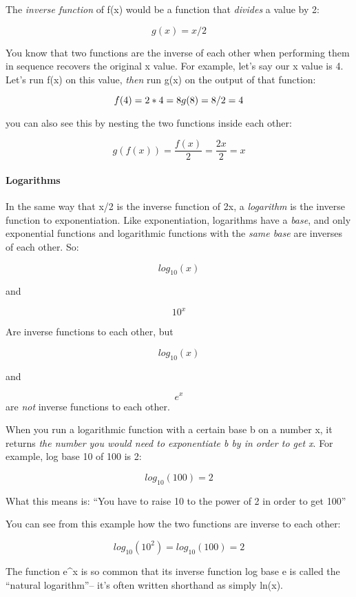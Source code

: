 \documentclass[]{article}
\let\oldparagraph\paragraph
\renewcommand{\paragraph}[1]{\oldparagraph{#1}\mbox{}}
\begin{document}
The \emph{inverse function} of f(x) would be a function that
\emph{divides} a value by 2:

\[ g(x) = x/2 \]

You know that two functions are the inverse of each other when
performing them in sequence recovers the original x value. For example,
let's say our x value is 4. Let's run f(x) on this value, \emph{then}
run g(x) on the output of that function:

\[ f(4) = 2*4 = 8 \\ g(8) = 8/2 = 4\]

you can also see this by nesting the two functions inside each other:

\[ g(f(x)) = \frac{f(x)}{2} = \frac{2x}{2} = x \]

\paragraph{Logarithms}\label{logarithms-1}

In the same way that x/2 is the inverse function of 2x, a
\emph{logarithm} is the inverse function to exponentiation. Like
exponentiation, logarithms have a \emph{base}, and only exponential
functions and logarithmic functions with the \emph{same base} are
inverses of each other. So:

\[ log_{10}(x) \]

and

\[ 10^x \]

Are inverse functions to each other, but

\[ log_{10}(x) \]

and

\[ e^x \] are \emph{not} inverse functions to each other.

When you run a logarithmic function with a certain base b on a number x,
it returns \emph{the number you would need to exponentiate b by in order
to get x}. For example, log base 10 of 100 is 2:

\[ log_{10}(100) = 2\]

What this means is: ``You have to raise 10 to the power of 2 in order to
get 100''

You can see from this example how the two functions are inverse to each
other:

\[ log_{10}(10^2) = log_{10}(100) = 2 \]

The function e\^{}x is so common that its inverse function log base e is
called the ``natural logarithm''-- it's often written shorthand as
simply ln(x).
\end{document}

